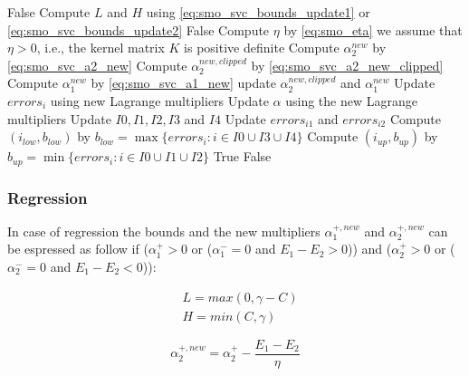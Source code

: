\begin{breakablealgorithm}
	\begin{algorithmic}
				\State \Return False
			\EndIf
			\State Compute $L$ and $H$ using \eqref{eq:smo_svc_bounds_update1} or \eqref{eq:smo_svc_bounds_update2}
				\State \Return False
			\EndIf
			\State Compute $\eta$ by \eqref{eq:smo_eta} \Comment we assume that $\eta > 0$, i.e., the kernel matrix $K$ is positive definite
			\State Compute $\alpha_2^{new}$ by \eqref{eq:smo_svc_a2_new}
			\State Compute $\alpha_2^{new,clipped}$ by \eqref{eq:smo_svc_a2_new_clipped}
			\State Compute $\alpha_1^{new}$ by \eqref{eq:smo_svc_a1_new}
				\State update $\alpha_2^{new,clipped}$ and $\alpha_1^{new}$
					\State Update $errors_i$ using new Lagrange multipliers
					\State Update $\alpha$ using the new Lagrange multipliers
					\State Update $I0, I1, I2, I3$ and $I4$
					\State Update $errors_{i1}$ and $errors_{i2}$
						\State Compute $(i_{low}, b_{low})$ by $b_{low} = \max\{errors_i : i \in I0 \cup I3 \cup I4\}$
						\State Compute $(i_{up}, b_{up})$ by $b_{up} = \min\{errors_i : i \in I0 \cup I1 \cup I2\}$
					\EndFor
				\EndFor
				\State \Return True
			\Else
				\State \Return False
			\EndIf
		\EndFunction
	\end{algorithmic}
\end{breakablealgorithm}

\subsubsection{Regression}

In case of regression the bounds and the new multipliers $\alpha_1^{+,new}$ and $\alpha_2^{+,new}$ can be espressed as follow if ($\alpha_1^+ > 0$ or ($\alpha_1^- = 0$ and $ E_1 - E_2 > 0$)) and ($\alpha_2^+ > 0$ or ($\alpha_2^- = 0$ and $ E_1 - E_2 < 0$)):

\begin{equation} \label{eq:smo_svr_bounds_update1}
	\begin{aligned}
		& L = max(0, \gamma - C) \\
		& H = min(C, \gamma)
	\end{aligned}
\end{equation}

\begin{equation} \label{eq:smo_svr_a2_new1}
	\alpha_2^{+,new} = \alpha_2^+ - \frac{E_1 - E_2}{\eta}
\end{equation}

